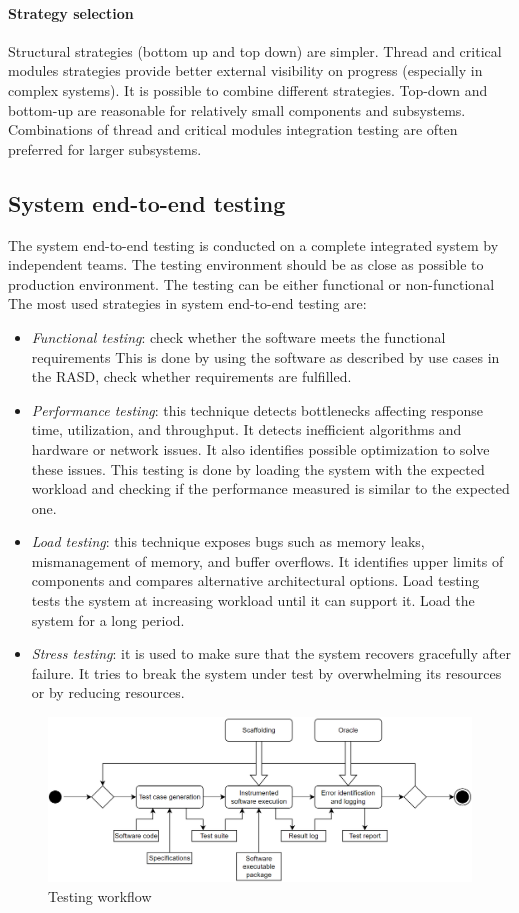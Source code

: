 \paragraph*{Strategy selection}
Structural strategies (bottom up and top down) are simpler. 
Thread and critical modules strategies provide better external visibility on progress (especially in complex systems). 
It is possible to combine different strategies. 
Top-down and bottom-up are reasonable for relatively small components and subsystems.
Combinations of thread and critical modules integration testing are often preferred for larger subsystems.

\subsection{System end-to-end testing}
The system end-to-end testing is conducted on a complete integrated system by independent teams. 
The testing environment should be as close as possible to production environment. 
The testing can be either functional or non-functional
The most used strategies in system end-to-end testing are: 
\begin{itemize}
    \item \textit{Functional testing}: check whether the software meets the functional requirements 
        This is done by using the software as described by use cases in the RASD, check whether requirements are fulfilled. 
    \item \textit{Performance testing}: this technique detects bottlenecks affecting response time, utilization, and throughput. 
        It detects inefficient algorithms and hardware or network issues. 
        It also identifies possible optimization to solve these issues. 
        This testing is done by loading the system with the expected workload and checking if the performance measured is similar to the expected one. 
    \item \textit{Load testing}: this technique exposes bugs such as memory leaks, mismanagement of memory, and buffer overflows. 
        It identifies upper limits of components and compares alternative architectural options. 
        Load testing tests the system at increasing workload until it can support it.  
        Load the system for a long period. 
    \item \textit{Stress testing}: it is used to make sure that the system recovers gracefully after failure.
        It tries to break the system under test by overwhelming its resources or by reducing resources.
\end{itemize}
\begin{figure}
    \centering
    \includegraphics[width=0.75\linewidth]{images/twf.png}
    \caption{Testing workflow}
\end{figure}

